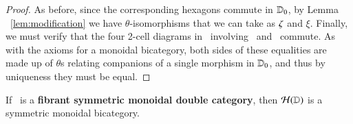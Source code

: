 \begin{proof}
  As before, since the corresponding hexagons commute in $\mathbb{D}_0$, by Lemma ~\ref{lem:modification} we have $\theta$-isomorphisms that we can take as $\zeta$
  and $\xi$.  Finally, we must verify that the four 2-cell diagrams
  in~\cite[p136--139]{mccrudden:bal-coalgb} involving \ze\ and \xi\
  commute.  As with the axioms for a monoidal bicategory, both sides
  of these equalities are made up of $\theta$s relating companions of
  a single morphism in $\mathbb{D}_0$, and thus by uniqueness they must be
  equal.


\end{proof}

\begin{lem}\label{thm:sym11-symbi}
  If \lD\ is a {\bf fibrant symmetric monoidal double category}, then $\mathcal{H}(\mathbb{D})$ is a
 symmetric monoidal bicategory.  
\end{lem}

